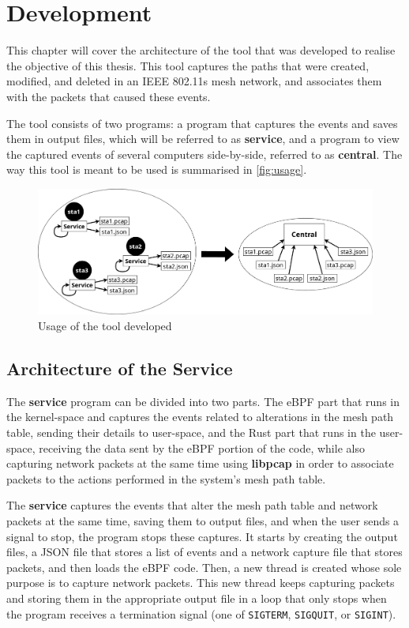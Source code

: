 \chapter{Development}\label{chap:devel}

This chapter will cover the architecture of the tool that was developed to
realise the objective of this thesis. This tool captures the paths that were
created, modified, and deleted in an \ac{IEEE} 802.11s mesh network, and
associates them with the packets that caused these events.

The tool consists of two programs: a program that captures the events and saves
them in output files, which will be referred to as \textbf{service}, and a
program to view the captured events of several computers side-by-side, referred
to as \textbf{central}. The way this tool is meant to be used is summarised in
\autoref{fig:usage}.

\begin{figure}[htb]
   \centering
   \includegraphics[scale=.225]{usage}
   \caption{Usage of the tool developed}\label{fig:usage}
\end{figure}


\section{Architecture of the Service}\label{sect:archser}

The \textbf{service} program can be divided into two parts. The eBPF part that
runs in the kernel-space and captures the events related to alterations in the
mesh path table, sending their details to user-space, and the Rust part that
runs in the user-space, receiving the data sent by the eBPF portion of the code,
while also capturing network packets at the same time using \textbf{libpcap} in
order to associate packets to the actions performed in the system's mesh path
table.

The \textbf{service} captures the events that alter the mesh path table and
network packets at the same time, saving them to output files, and when the user
sends a signal to stop, the program stops these captures. It starts by creating
the output files, a JSON file that stores a list of events and a network capture
file that stores packets, and then loads the eBPF code. Then, a new thread is
created whose sole purpose is to capture network packets. This new thread keeps
capturing packets and storing them in the appropriate output file in a loop that
only stops when the program receives a termination signal (one of
\texttt{SIGTERM}, \texttt{SIGQUIT}, or \texttt{SIGINT}).

